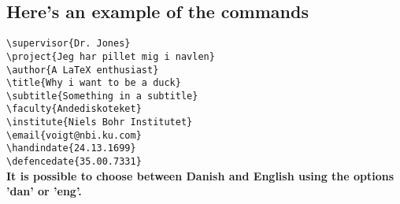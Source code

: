 \subsection*{Here's an example of the commands}

\noindent \verb|\supervisor{Dr. Jones}|\\
\verb|\project{Jeg har pillet mig i navlen}|\\
\verb|\author{A LaTeX enthusiast}|\\
\verb|\title{Why i want to be a duck}|\\
\verb|\subtitle{Something in a subtitle}|\\
\verb|\faculty{Andediskoteket}|\\
\verb|\institute{Niels Bohr Institutet}|\\
\verb|\email{voigt@nbi.ku.com}|\\
\verb|\handindate{24.13.1699}|\\
\verb|\defencedate{35.00.7331}|\\

\textbf{It is possible to choose between Danish and English using the options 'dan' or 'eng'.}

